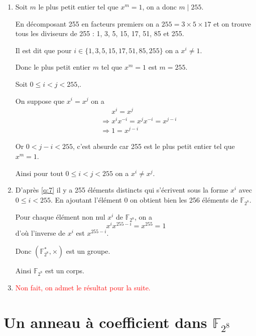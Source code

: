 \documentclass[a4paper, 12pt]{article}
\begin{document}
\begin{enumerate}[label=\textbf{Question \arabic*.}, leftmargin=*]
Ainsi on a $x^{256} = x$ dans $\mathbb{F}_{2^8}$.

Donc $x^{255} = x^{256}x^{-1} = x x^{-1} = 1$

    \item\label{q:7} Soit $m$ le plus petit entier tel que $x^m = 1$, on a donc $m \mid 255$.

En décomposant 255 en facteurs premiers on a $255 = 3 \times 5 \times 17$ et on trouve
tous les diviseurs de 255 : 1, 3, 5, 15, 17, 51, 85 et 255.

Il est dit que pour $i \in \{1, 3, 5, 15, 17, 51, 85, 255\}$ on a $x^i \neq 1$.

Donc le plus petit entier $m$ tel que $x^m = 1$ est $m = 255$.

Soit $0 \leq i < j < 255$,.

On suppose que $x^i = x^j$ on a
\begin{align*}
    &\phantom{\rightarrow} x^i = x^j \\
    &\Rightarrow x^i x^{-i} = x^j x^{-i} = x^{j-i} \\
    &\Rightarrow 1 = x^{j-i}
\end{align*}

Or $0 < j-i < 255$, c'est absurde car 255 est le plus petit entier tel que $x^m = 1$.

Ainsi pour tout $0 \leq i < j < 255$ on a $x^i \neq x^j$.

    \item\label{q:8} D'après \ref{q:7} il y a 255 éléments distincts qui s'écrivent sous la forme $x^i$ avec $0 \leq i < 255$.
En ajoutant l'élément 0 on obtient bien les 256 éléments de $\mathbb{F}_{2^8}$.

Pour chaque élément non nul $x^i$ de $\mathbb{F}_{2^8}$, on a
$$
x^i x^{255-i} = x^{255} = 1
$$
d'où l'inverse de $x^i$ est $x^{255-i}$.

Donc $(\mathbb{F}_{2^8}^*, \times)$ est un groupe.

Ainsi $\mathbb{F}_{2^8}$ est un corps.

    \item\label{q:9} \textcolor{red}{Non fait, on admet le résultat pour la suite.}

\end{enumerate}

\section{Un anneau à coefficient dans $\mathbb{F}_{2^8}$}
\end{document}
